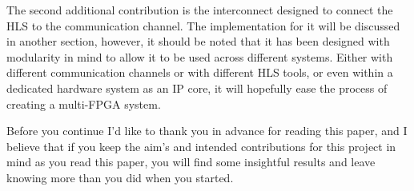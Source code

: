 The second additional contribution is the interconnect designed to connect the HLS to the communication channel. The implementation for it will be discussed in another section, however, it should be noted that it has been designed with modularity in mind to allow it to be used across different systems. Either with different communication channels or with different HLS tools, or even within a dedicated hardware system as an IP core, it will hopefully ease the process of creating a multi-FPGA system. 

Before you continue I'd like to thank you in advance for reading this paper, and I believe that if you keep the aim's and intended contributions for this project in mind as you read this paper, you will find some insightful results and leave knowing more than you did when you started.







